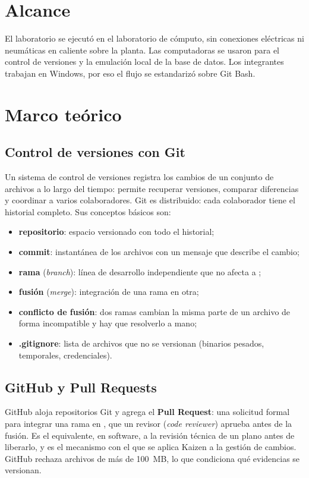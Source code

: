 \documentclass[a4paper,11pt]{article}
\begin{document}
\section{Alcance}
El laboratorio se ejecutó en el laboratorio de cómputo, sin conexiones eléctricas ni neumáticas en caliente sobre la planta. Las computadoras se usaron para el control de versiones y la emulación local de la base de datos. Los integrantes trabajan en Windows, por eso el flujo se estandarizó sobre Git Bash.

\section{Marco teórico}
\subsection{Control de versiones con Git}
Un sistema de control de versiones registra los cambios de un conjunto de archivos a lo largo del tiempo: permite recuperar versiones, comparar diferencias y coordinar a varios colaboradores. Git es distribuido: cada colaborador tiene el historial completo. Sus conceptos básicos son:
\begin{itemize}
\item \textbf{repositorio}: espacio versionado con todo el historial;
\item \textbf{commit}: instantánea de los archivos con un mensaje que describe el cambio;
\item \textbf{rama} (\emph{branch}): línea de desarrollo independiente que no afecta a ;
\item \textbf{fusión} (\emph{merge}): integración de una rama en otra;
\item \textbf{conflicto de fusión}: dos ramas cambian la misma parte de un archivo de forma incompatible y hay que resolverlo a mano;
\item \textbf{.gitignore}: lista de archivos que no se versionan (binarios pesados, temporales, credenciales).
\end{itemize}

\subsection{GitHub y Pull Requests}
GitHub aloja repositorios Git y agrega el \textbf{Pull Request}: una solicitud formal para integrar una rama en , que un revisor (\emph{code reviewer}) aprueba antes de la fusión. Es el equivalente, en software, a la revisión técnica de un plano antes de liberarlo, y es el mecanismo con el que se aplica Kaizen a la gestión de cambios. GitHub rechaza archivos de más de 100~MB, lo que condiciona qué evidencias se versionan.
\end{document}
